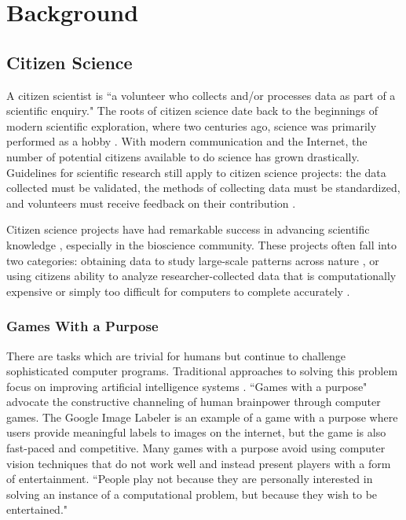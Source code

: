 \chapter{Background}

\section{Citizen Science}

A citizen scientist is ``a volunteer who collects and/or processes data as part of a scientific enquiry." \cite{silvertown2009new} The roots of citizen science date back to the beginnings of modern scientific exploration, where two centuries ago, science was primarily performed as a hobby \cite{silvertown2009new}. With modern communication and the Internet, the number of potential citizens available to do science has grown drastically. Guidelines for scientific research still apply to citizen science projects: the data collected must be validated, the methods of collecting data must be standardized, and volunteers must receive feedback on their contribution \cite{silvertown2009new}.

Citizen science projects have had remarkable success in advancing scientific knowledge \cite{bonney2009citizen}, especially in the bioscience community. These projects often fall into two categories: obtaining data to study large-scale patterns across nature \cite{bonney2009citizen}, or using citizens ability to analyze researcher-collected data that is computationally expensive \cite{cooper2010challenge} \cite{canthepower} or simply too difficult for computers to complete accurately \cite{milkyway2014}.

\subsection{Games With a Purpose}

There are tasks which are trivial for humans but continue to challenge sophisticated computer programs. Traditional approaches to solving this problem focus on improving artificial intelligence systems \cite{gwap}. ``Games with a purpose" \cite{gwap} advocate the constructive channeling of human brainpower through computer games. The Google Image Labeler \cite{googleimagelabeler} is an example of a game with a purpose where users provide meaningful labels to images on the internet, but the game is also fast-paced and competitive. Many games with a purpose avoid using computer vision techniques that do not work well and instead present players with a form of entertainment. ``People play not because they are personally interested in solving an instance of a computational problem, but because they wish to be entertained." \cite{gwap}

